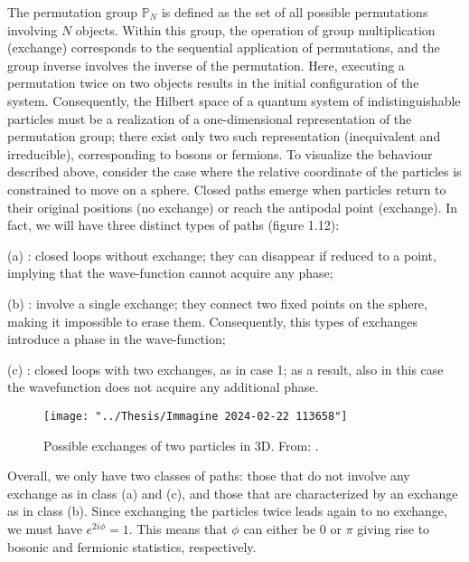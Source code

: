\documentclass{Configuration_Files/PoliMi3i_thesis}
\begin{document}
The permutation group $\mathbb{P}_N$ is defined as the set of all possible permutations involving $N$ objects. Within this group, the operation of group multiplication (exchange) corresponds to the sequential application of permutations, and the group inverse involves the inverse of the permutation. Here, executing a permutation twice on two objects results in the initial configuration of the system.
Consequently, the Hilbert space of a quantum system of indistinguishable particles must be a realization of a one-dimensional representation of the permutation group; there exist only two such representation (inequivalent and irreducible), corresponding to bosons or fermions.
To visualize the behaviour described above, consider the case where the relative coordinate of the particles is constrained to move on a sphere. Closed paths emerge when particles return to their original positions (no exchange) or reach the antipodal point (exchange). In fact, we will have three distinct types of paths (figure 1.12): 

\begin{center}
	\item[(a)]: closed loops without exchange; they can disappear if reduced to a point, implying that the wave-function cannot acquire any phase; 
	
	\item[(b)] : involve a single exchange; they connect two fixed points on the sphere, making it impossible to erase them. Consequently, this types of exchanges introduce a phase in the wave-function;
	
	\item[(c)] : closed loops with two exchanges, as in case 1; as a result, also in this case the wavefunction does not acquire any additional phase.
\end{center}

\begin{figure}
	\centering
	\texttt{[image: "../Thesis/Immagine 2024-02-22 113658"]}
	\caption{{ Possible exchanges of two particles in 3D. From: \cite{Rao16}.}}
	\label{fig:immagine-2024-02-22-113658}
\end{figure}

Overall, we only have two classes of paths: those that do not involve any exchange as in class (a) and (c), and those that are characterized by an exchange as in class (b). 
Since exchanging the particles twice leads again to no exchange, we must have $e^{2i \phi} = 1$. This means that $\phi$ can either be 0 or $\pi$ giving rise to bosonic and fermionic statistics, respectively. 
\end{document}
